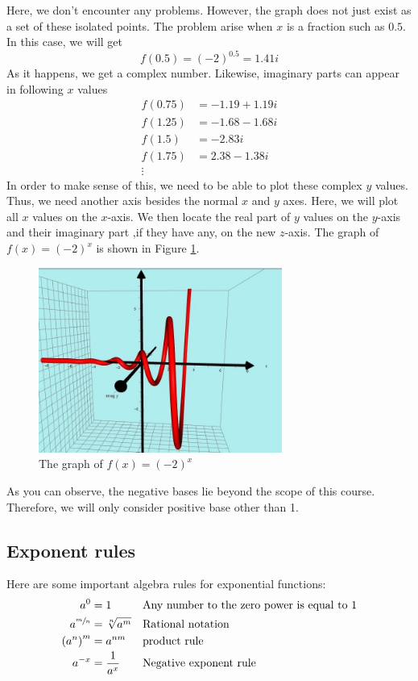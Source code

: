 Here, we don't encounter any problems. However, the graph does not just exist as a set
of these isolated points. The problem arise when $x$ is a fraction such as $0.5$. In this case,
we will get \[
						f(0.5) =(-2)^{0.5} = 1.41i		
			\] 
As it happens, we get a complex number. Likewise, imaginary parts can appear in following $x$
values
		\begin{align*}	
		f(0.75) &= -1.19 + 1.19i \\
		f(1.25) &= -1.68 - 1.68i  \\
		f(1.5) &= -2.83i  \\
		f(1.75) &= 2.38 - 1.38i \\
		\vdots
		\end{align*}
In order to make sense of this, we need to be able to plot these complex $y$ values.
Thus, we need another axis besides the normal $x$ and $y$ axes. Here, we will plot all $x$ values
on the $x$-axis. We then locate the real part of $y$ values on the $y$-axis and their
imaginary part ,if they have any, on the new $z$-axis. The graph of $f(x)=(-2)^x$
is shown in Figure \ref{fig:neg}.
		\begin{figure}[H]
		 \includegraphics[width=8cm]{pics/neg_base.jpeg}
		 \centering
		 \caption{The graph of $f(x)=(-2)^x$}
		 \label{fig:neg}
		\end{figure}
As you can observe, the negative bases lie beyond the scope of this course. Therefore, we will
only consider positive base other than 1.
\subsection{Exponent rules}
Here are some important algebra rules for exponential functions:
	\begin{align}
		a^0 &= 1	&&\text{Any number to the zero power is equal to 1}\label{zero_exp} \\
		a^{\sfrac{m}{n}} &= \sqrt[n]{a^m} &&\text{Rational notation}	\label{rat_exp}\\
		\left(a^n\right)^m &= a^{nm} &&\text{product rule} \label{prd_exp}\\
		a^{-x} &= \frac{1}{a^x}	&&\text{Negative exponent rule} \label{neg_exp}
	\end{align}
